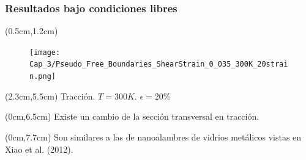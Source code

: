 \begin{frame}
  \frametitle{Resultados bajo condiciones libres}
  
  \begin{textblock*}{5cm}(0.5cm,1.2cm)
    \begin{figure}[htp]
      \centering
      \texttt{[image: Cap\_3/Pseudo\_Free\_Boundaries\_ShearStrain\_0\_035\_300K\_20strain.png]}
    \end{figure}
  \end{textblock*}
  
  
  \begin{textblock*}{4cm}(2.3cm,5.5cm)
   \scriptsize{Tracci\'on. $T=300K$. $\epsilon=20\%$}
  \end{textblock*}
  
  
  \begin{textblock*}{7cm}(0cm,6.5cm)
   \centering
   \small{Existe un cambio de la secci\'on transversal en tracci\'on.}
  \end{textblock*}
  \begin{textblock*}{9cm}(0cm,7.7cm)
   \centering
   \small{Son similares a las de nanoalambres de vidrios met\'alicos vistas en Xiao et al. (2012).\\}
  \end{textblock*}
  
  

\end{frame}
